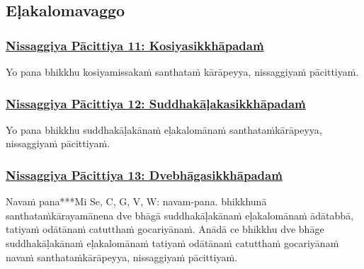 \subsection{Eḷakalomavaggo}

\subsubsection*{\hyperref[forf-exp11]{Nissaggiya Pācittiya 11: Kosiyasikkhāpadaṁ}}
\label{np11}

Yo pana bhikkhu kosiyamissakaṁ santhataṁ kārāpeyya, nissaggiyaṁ pācittiyaṁ.



\subsubsection*{\hyperref[forf-exp12]{Nissaggiya Pācittiya 12: Suddhakāḷakasikkhāpadaṁ}}
\label{np12}

Yo pana bhikkhu suddhakāḷakānaṁ eḷakalomānaṁ santhataṁ\makeatletter\hyperlink{endnote178-appendix}\makeatother \thinspace kārāpeyya, nissaggiyaṁ pācittiyaṁ.



\subsubsection*{\hyperref[forf-exp13]{Nissaggiya Pācittiya 13: Dvebhāgasikkhāpadaṁ}}
\label{np13}

Navaṁ pana***Mi Se, C, G, V, W: navam-pana. bhikkhunā santhataṁ\makeatletter\hyperlink{endnote179-appendix}\makeatother \thinspace kārayamānena dve bhāgā suddhakāḷakānaṁ eḷakalomānaṁ ādātabbā, tatiyaṁ odātānaṁ catutthaṁ gocariyānaṁ. Anādā ce bhikkhu dve bhāge suddhakāḷakānaṁ eḷakalomānaṁ tatiyaṁ odātānaṁ catutthaṁ gocariyānaṁ navaṁ santhataṁ\makeatletter\hyperlink{endnote180-appendix}\makeatother \thinspace kārāpeyya, nissaggiyaṁ pācittiyaṁ.



